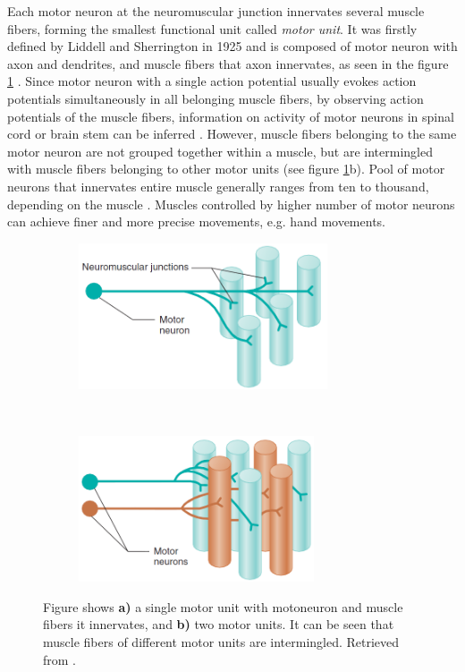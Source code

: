 Each motor neuron at the neuromuscular junction innervates several muscle fibers, forming the smallest functional unit called \emph{motor unit}. It was firstly defined by Liddell and Sherrington in 1925 \citep{Liddell1925, Sherrington1925} and is composed of motor neuron with axon and dendrites, and muscle fibers that axon innervates, as seen in the figure \ref{fig:motor units} \citep{Duchateau2011}. Since motor neuron with a single action potential usually evokes action potentials simultaneously in all belonging muscle fibers, by observing action potentials of the muscle fibers, information on activity of motor neurons in spinal cord or brain stem can be inferred \citep{Merletti-Farina-book}. However, muscle fibers belonging to the same motor neuron are not grouped together within a muscle, but are intermingled with muscle fibers belonging to other motor units (see figure \ref{fig:motor units}b). Pool of motor neurons that innervates entire muscle generally ranges from ten to thousand, depending on the muscle \citep{Merletti-Farina-book}. Muscles controlled by higher number of motor neurons can achieve finer and more precise movements, e.g. hand movements.
\begin{figure}[t!]
    \centering
    \begin{subfigure}[t]{0.49\textwidth}
        \centering
        \includegraphics[height=1.7in]{Images/introduction/one_MU.png}
        \caption{}
    \end{subfigure}%
    ~ 
    \begin{subfigure}[t]{0.49\textwidth}
        \centering
        \includegraphics[height=1.7in]{Images/introduction/two_MU.png}
        \caption{}
    \end{subfigure}
    \caption{Figure shows \textbf{a)} a single motor unit with motoneuron and muscle fibers it innervates, and \textbf{b)} two motor units. It can be seen that muscle fibers of different motor units are intermingled. Retrieved from \citet{Widmaier2014}.}
\label{fig:motor units}
\end{figure}


